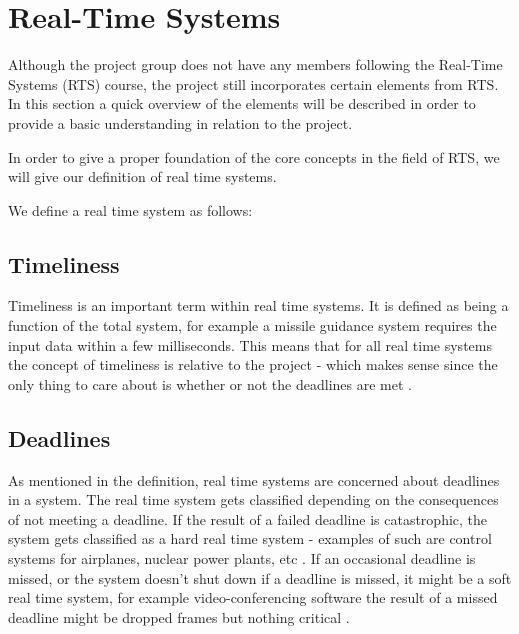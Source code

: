 \section{Real-Time Systems}
Although the project group does not have any members following the Real-Time
Systems (RTS) course, the project still incorporates certain elements from RTS.
In this section a quick overview of the elements will be described in order to provide a basic
understanding in relation to the project.

In order to give a proper foundation of the core concepts in the field of RTS,
we will give our definition of real time systems. \nl

We define a real time system as follows:\nl

 \nl

\subsection{Timeliness}
Timeliness is an important term within real time systems. It is defined as being
a function of the total system, for example a missile guidance system requires
the input data within a few milliseconds. This means that for all real time
systems the concept of timeliness is relative to the project - which makes sense since the only thing
to care about is whether or not the deadlines are met \Source.

\subsection{Deadlines}
As mentioned in the definition, real time systems are concerned about
deadlines in a system.
The real time system gets classified depending on the consequences of not
meeting a deadline. If the result of a failed deadline is catastrophic, the
system gets classified as a hard real time system - examples of such are control
systems for airplanes, nuclear power plants, etc \Source.
If an occasional deadline is missed, or the system doesn't shut down if a
deadline is missed, it might be a soft real time system, for example
video-conferencing software the result of a missed deadline might be dropped
frames but nothing critical \Source.

